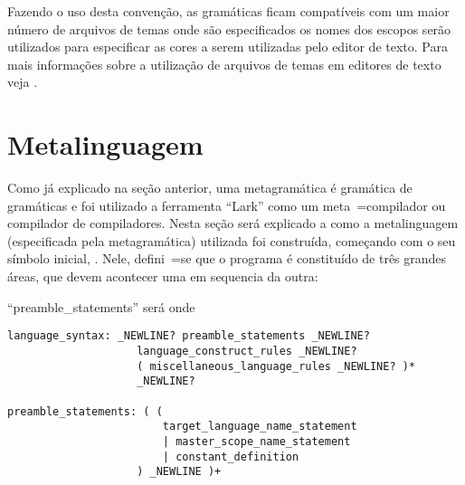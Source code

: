 Fazendo o uso desta convenção,
as gramáticas ficam compatíveis com um maior número de arquivos de temas onde são especificados os nomes dos escopos serão utilizados para especificar as cores a serem utilizadas pelo editor de texto.
Para mais informações sobre a utilização de arquivos de temas em editores de texto veja .


\section{Metalinguagem}

Como já explicado na seção anterior,
uma metagramática é gramática de gramáticas e
foi utilizado a ferramenta ``Lark'' \cite{larkContextualLexer} como um meta~=compilador ou
compilador de compiladores.
Nesta seção será explicado a como a metalinguagem (especificada pela metagramática) utilizada foi construída,
começando com o seu símbolo inicial,
.
Nele,
defini~=se que o programa é constituído de três grandes áreas,
que devem acontecer uma em sequencia da outra:
\begin{inparaenum}[1)]
\item ``preamble\_statements'' será onde
\end{inparaenum}%
\begin{lstlisting}[caption={Simbolo Inicial da Metalinguagem},label={simboloInicialDaMetalinguagem}]
language_syntax: _NEWLINE? preamble_statements _NEWLINE?
                    language_construct_rules _NEWLINE?
                    ( miscellaneous_language_rules _NEWLINE? )*
                    _NEWLINE?

preamble_statements: ( (
                        target_language_name_statement
                        | master_scope_name_statement
                        | constant_definition
                    ) _NEWLINE )+
\end{lstlisting}

